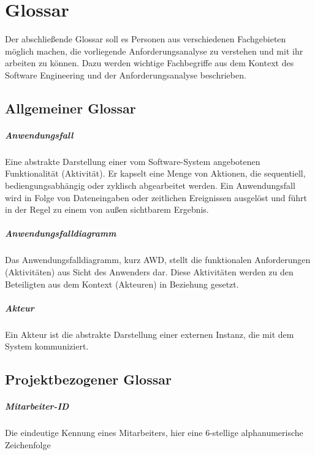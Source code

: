 \newpage

\chapter{Glossar}
Der abschlie{\ss}ende Glossar soll es Personen aus verschiedenen Fachgebieten möglich machen, die vorliegende Anforderungsanalyse zu verstehen und mit ihr arbeiten zu können. Dazu werden wichtige Fachbegriffe aus dem Kontext des Software Engineering und der Anforderungsanalyse beschrieben.

\section{Allgemeiner Glossar}
\paragraph{Anwendungsfall}
Eine abstrakte Darstellung einer vom Software-System angebotenen Funktionalität (Aktivität). Er kapselt eine Menge von Aktionen, die sequentiell, bediengungsabhängig oder zyklisch abgearbeitet werden. Ein Anwendungsfall wird in Folge von Dateneingaben oder zeitlichen Ereignissen ausgelöst und führt in der Regel zu einem von au{\ss}en sichtbarem Ergebnis.

\paragraph{Anwendungsfalldiagramm}
Das Anwendungsfalldiagramm, kurz AWD, stellt die funktionalen Anforderungen (Aktivitäten) aus Sicht des Anwenders dar. Diese Aktivitäten werden zu den Beteiligten aus dem Kontext (Akteuren) in Beziehung gesetzt.

\paragraph{Akteur}
Ein Akteur ist die abstrakte Darstellung einer externen Instanz, die mit dem System kommuniziert.


\section{Projektbezogener Glossar}
\paragraph{Mitarbeiter-ID} Die eindeutige Kennung eines Mitarbeiters, hier eine 6-stellige alphanumerische Zeichenfolge

